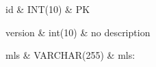 id & INT(10) & PK \tabularnewline\hline 












  version & int(10) & no description \tabularnewline\hline









	mls & VARCHAR(255) & mls: \tabularnewline\hline 
